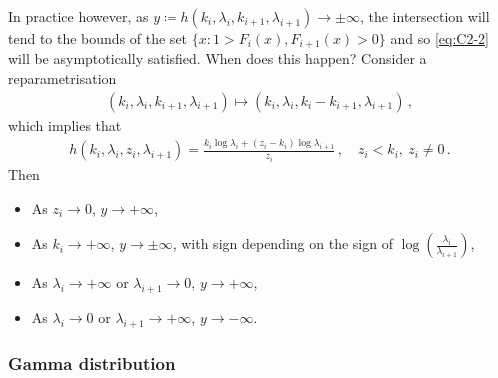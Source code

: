 \documentclass{article}
\begin{document}
%
In practice however, as
$y \coloneqq h(k_i, \lambda_i, k_{i+1}, \lambda_{i+1}) \to \pm \infty$,
the intersection will tend to the bounds of the set
$\{x \colon 1 > F_i(x), F_{i + 1}(x) > 0\}$ and so \eqref{eq:C2-2}
will be asymptotically satisfied. When does this happen?
Consider a reparametrisation
%
\begin{align*}
	(k_i, \lambda_i, k_{i + 1}, \lambda_{i + 1}) \mapsto
		(k_i, \lambda_i, k_i - {k_{i + 1}}, \lambda_{i + 1}) \,,
\end{align*}
%
which implies that
%
\begin{align*}
	h(k_i, \lambda_i, z_{i}, \lambda_{i+1})
		=\frac{k_i \log\lambda_i + {(z_{i} - k_{i})}
		\log\lambda_{i + 1}}{z_{i}} \,,
		\quad z_{i} < k_i,\ z_{i} \neq 0 \,.
\end{align*}
%
Then
%
\begin{itemize}
	\item As $z_i \to 0$, $y \to +\infty$,
	\item As $k_i \to +\infty$, $y \to \pm\infty$, with sign depending
		on the sign of $\log(\frac{\lambda_i}{\lambda_{i + 1}})$,
	\item As $\lambda_i \to +\infty$ or $\lambda_{i + 1} \to 0$,
		$y \to +\infty$,
	\item As $\lambda_i \to 0$ or  $\lambda_{i + 1}\to +\infty$,
		$y \to -\infty$.
\end{itemize}
%
\subsubsection*{Gamma distribution}
%
\end{document}
